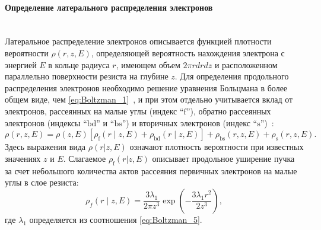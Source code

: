 \paragraph{Определение латерального распределения электронов} \mbox{} \\
\indent Латеральное распределение электронов описывается функцией плотности вероятности $\rho(r, z, E)$, определяющей вероятность нахождения электрона с энергией $E$ в кольце радиуса $r$, имеющем объем $2 \pi r dr dz$ и расположенном параллельно поверхности резиста на глубине $z$. Для определения продольного распределения электронов необходимо решение уравнения Больцмана в более общем виде, чем \ref{eq:Boltzman_1}~\cite{ME_rev_63}, и при этом отдельно учитывается вклад от электронов, рассеянных на малые углы (индекс ``$\mathrm{f}$''), обратно рассеянных электронов (индексы ``$\mathrm{bd}$'' и ``$\mathrm{bs}$'') и вторичных электронов (индекс ``$\mathrm{s}$'')~\cite{ME_rev_64}:
\begin{equation} \label{eq:Boltzman_10}
	\rho(r, z, E)=\rho(z, E)\left[\rho_\mathrm{f}(r \mid z, E)+\rho_\mathrm{bd}(r \mid z, E)\right]+\rho_\mathrm{bs}(r, z, E)+\rho_\mathrm{s}(r, z, E).
\end{equation}
Здесь выражения вида $\rho(r|z,E)$ означают плотность вероятности при известных значениях $z$ и $E$. Слагаемое $\rho_\mathrm{f}(r|z,E)$ описывает продольное уширение пучка за счет небольшого количества актов рассеяния первичных электронов на малые углы в слое резиста:
\begin{equation} \label{eq:Boltzman_11}
	\rho_f(r \mid z, E)=\frac{3 \lambda_1}{2 \pi z^3} \exp \left(-\frac{3 \lambda_1 r^2}{2 z^3}\right),
\end{equation}
где $\lambda_1$ определяется из соотношения \ref{eq:Boltzman_5}.

